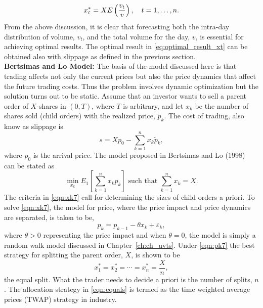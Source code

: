 	\begin{equation} \label{eq:optimal_result_xt}
	x_t^*= X E\left(\dfrac{v_t}{v}\right), \enskip\enskip t=1,\ldots,n.
	\end{equation}
From the above discussion, it is clear that forecasting both the intra-day distribution of volume, $v_t$, and the total volume for the day, $v$, is essential for achieving optimal results. The optimal result in \eqref{eq:optimal_result_xt} can be obtained also with slippage as defined in the previous section. \\


\noindent\textbf{Bertsimas and Lo Model:} The basis of the model discussed here is that trading affects not only the current prices but also the price dynamics that affect the future trading costs. Thus the problem involves dynamic optimization but the solution turns out to be static. Assume that an investor wants to sell a parent order of $X$-shares in $(0,T)$, where $T$ is arbitrary, and let $x_k$ be the number of shares sold (child orders) with the realized price, $\widetilde{p}_k$. The cost of trading, also know as slippage is
	\begin{equation} \label{eqn:x7}
	s= Xp_0 - \sum_{k=1}^n x_k\widetilde{p}_k,
	\end{equation}
where $p_0$ is the arrival price. The model proposed in Bertsimas and Lo (1998)~\cite{berlo} can be stated as
	\begin{equation} \label{eqn:xk7}
	\min_{x_k} E_1 \left[\sum_{k=1}^n x_kp_k\right] \text{ such that }\sum_{k=1}^n x_k=X.
	\end{equation}
The criteria in \eqref{eqn:xk7} call for determining the sizes of child orders a priori. To solve \eqref{eqn:xk7}, the model for price, where the price impact and price dynamics are separated, is taken to be,
	\begin{equation} \label{eqn:pk7}
	p_k = p_{k-1} - \theta x_k + \varepsilon_k,
	\end{equation}
where $\theta > 0$ representing the price impact and when $\theta = 0$, the model is simply a random walk model discussed in Chapter~\ref{ch:ch_uvts}. Under \eqref{eqn:pk7} the best strategy for splitting the parent order, $X$, is shown to be
	\begin{equation} \label{eqn:equals}
	x_1^* = x_2^* = \cdots = x_n^* = \frac{X}{n},
	\end{equation}
the equal split. What the trader needs to decide a priori is the number of splits, $n$. The allocation strategy in \eqref{eqn:equals} is termed as the time weighted average prices (TWAP) strategy in industry. 


